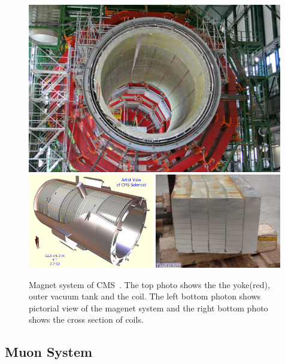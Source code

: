 %
\begin{figure}[h] 
\vspace{1cm}
\includegraphics[width=0.99\textwidth]{figures/Figure_CP-1.jpg} \\
\includegraphics[width=0.49\textwidth]{figures/CMS-solenoid-magnet.jpg} 
\includegraphics[width=0.49\textwidth]{figures/magnet-2000-049.jpg}
\caption{Magnet system of CMS~\cite{cmstdr1}. The top photo shows 
the the yoke(red), outer vacuum tank and the coil. The left bottom photon shows 
pictorial view of the magenet system and the right bottom photo shows 
the cross section of coils.}
\label{fig:magnet} 
\end{figure} 



\subsection{Muon System} 

